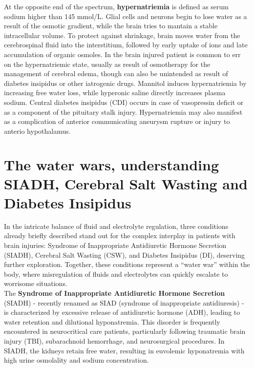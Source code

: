 At the opposite end of the spectrum, \textbf{hypernatriemia} is defined as serum sodium higher than 145 mmol/L. Glial cells and neurons begin to lose water as a result of the osmotic gradient, while the brain tries to mantain a stable intracellular volume. To protect against  shrinkage, brain moves water from the cerebrospinal fluid into the interstitium, followed by early uptake of ions and late accumulation of organic osmoles. 
\newline In the brain injured patient is common to err on the hypernatriemic state, usually as result of osmotherapy for the management of cerebral edema, though can also be unintended as result of diabetes insipidus or other iatrogenic drugs.
\newline Mannitol induces hypernatriemia by increasing free water loss, while hyperonic saline directly increases plasma sodium.
\newline Central diabetes insipidus (CDI) occurs in case of vasopressin deficit or as a component of the pituitary stalk injury. Hypernatriemia may also manifest as a complication of anterior communicating aneurysm rupture or injury to anterio hypothalamus\cite{mahannaManagementSodiumAbnormalities2015a}.\\

\section[The water wars, understanding SIADH, CSW and DI]{The water wars, understanding SIADH, Cerebral Salt Wasting and Diabetes Insipidus}
In the intricate balance of fluid and electrolyte regulation, three conditions already briefly described stand out for the complex interplay in patients with brain injuries: Syndrome of Inappropriate Antidiuretic Hormone Secretion (SIADH), Cerebral Salt Wasting (CSW), and Diabetes Insipidus (DI), deserving further exploration. 
Together, these conditions represent a “water war” within the body, where misregulation of fluids and electrolytes can quickly escalate to worrisome situations.\\

The \textbf {Syndrome of Inappropriate Antidiuretic Hormone Secretion} (SIADH) - recently renamed as SIAD (syndrome of inappropriate antidiuresis) - is characterized by excessive release of antidiuretic hormone (ADH), leading to water retention and dilutional hyponatremia. This disorder is frequently encountered in neurocritical care patients, particularly following traumatic brain injury (TBI), subarachnoid hemorrhage, and neurosurgical procedures. In SIADH, the kidneys retain free water, resulting in euvolemic hyponatremia with high urine osmolality and sodium concentration. 

